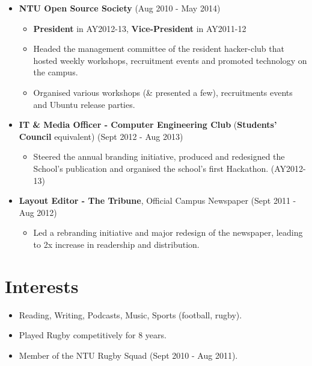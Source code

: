 \begin{itemize}
\tightlist
\item
  \textbf{NTU Open Source Society} \hfill (Aug 2010 - May 2014)

  \begin{itemize}
  \tightlist
  \item
    \textbf{President} in AY2012-13, \textbf{Vice-President} in
    AY2011-12
  \item
    Headed the management committee of the resident hacker-club that
    hosted weekly workshops, recruitment events and promoted technology
    on the campus.
  \item
    Organised various workshops (\& presented a few), recruitments
    events and Ubuntu release parties.
  \end{itemize}
\item
  \textbf{IT \& Media Officer - Computer Engineering Club}
  (\textbf{Students' Council} equivalent) \hfill (Sept 2012 - Aug 2013)

  \begin{itemize}
  \tightlist
  \item
    Steered the annual branding initiative, produced and redesigned the
    School's publication and organised the school's first Hackathon.
    (AY2012-13)
  \end{itemize}
\item
  \textbf{Layout Editor - The Tribune}, Official Campus Newspaper
  \hfill (Sept 2011 - Aug 2012)

  \begin{itemize}
  \tightlist
  \item
    Led a rebranding initiative and major redesign of the newspaper,
    leading to 2x increase in readership and distribution.
  \end{itemize}
\end{itemize}

\section{Interests}\label{interests}

\begin{itemize}
\tightlist
\item
  Reading, Writing, Podcasts, Music, Sports (football, rugby).
\item
  Played Rugby competitively for 8 years.
\item
  Member of the NTU Rugby Squad (Sept 2010 - Aug 2011).
\end{itemize}
